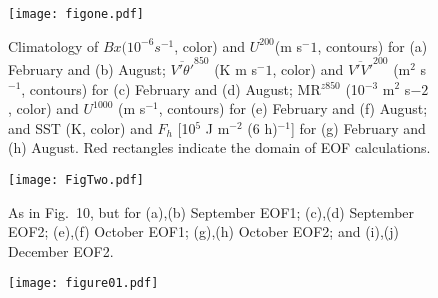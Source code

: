 \documentclass{ametsoc}
\begin{document}

\begin{figure}[t]
\centerline{\texttt{[image: figone.pdf]}}

\caption{Climatology of $Bx (10^{-6} s^{-1}$, color) and $U^{200}$(m s$^-1$,
contours) for (a) February and (b) August; $\overline{V'\theta'}^{850}$
(K m s$^-1$, color) and 
$\overline{V'V'}^{200}$
(m$^2$ s$^{-1}$, contours) for (c) February and (d) August; MR$^{z850}$ 
(10$^{-3}$ m$^2$ s$-2$, color) and $U^{1000}$ (m s$^{-1}$, contours) 
for (e) February and (f) August;
and SST (K, color) and $F_h$ [10$^5$ J m$^{-2}$ (6 h)$^{-1}$] for (g)
February and (h) August. Red rectangles indicate the domain of EOF
calculations.} \label{fig1} 
\end{figure}

\begin{figure}[p]
\centerline{\texttt{[image: FigTwo.pdf]}}
\caption{As in Fig.~10, but for (a),(b) September EOF1; (c),(d) September EOF2; (e),(f) October EOF1; (g),(h) October EOF2; and
(i),(j) December EOF2.}
\end{figure}

\begin{figure}
 \centerline{\texttt{[image: figure01.pdf]}}
\end{figure}
\end{document}
